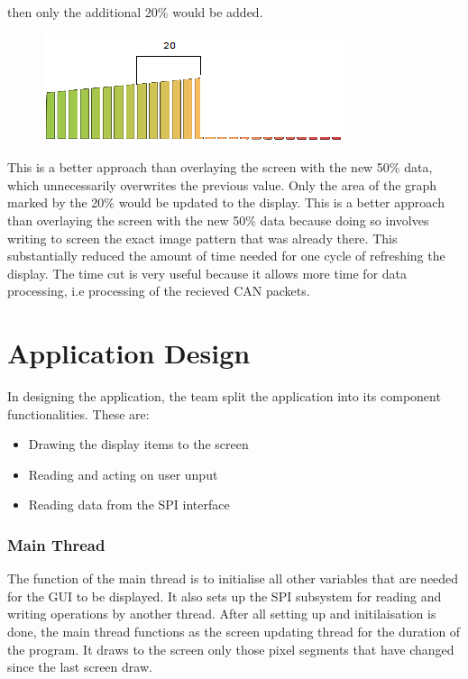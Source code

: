 \documentclass[11pt]{report} %
\begin{document}
\begin{itemize}
	then only the additional 20\% would be added.
				
	\begin{figure}[H]
	\centering
	\includegraphics[scale=0.80]{images/rpm_combo.png}
	\caption{ }\label{fig:rpm combo}
	\end{figure}
			
				
	This is a better approach than overlaying the screen with the new 50\% data, which
	unnecessarily overwrites the previous value.
	Only the area of the graph marked by the 20\% would be updated to the display.
	This is a better approach than overlaying the screen with the new 50\% data because doing so involves
	writing to screen the exact image pattern that was already there. This substantially reduced the 
	amount of time needed for one cycle of refreshing the display. The time cut is very useful because it allows more 
	time for data processing, i.e processing of the recieved CAN packets. 
	\end{itemize}
	\section {Application Design}
	
	
	In designing the application, the team split the application into its component functionalities. 
	These are:
	
	\begin{itemize}
	\item Drawing the display items to the screen
	\item Reading and acting on user unput
	\item Reading data from the SPI interface
	\end{itemize}
	

	
	\subsubsection{Main Thread}
		The function of the main thread is to initialise all other variables that are needed for the GUI to be displayed.
		It also sets up the SPI subsystem for reading  and writing operations by another thread.
		After all setting up and initilaisation is done, the main thread functions as the screen updating thread
		for the duration of the program. It draws to the screen only those pixel segments that have changed since the last screen draw.
		
\end{document}
